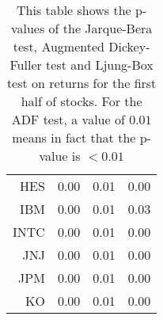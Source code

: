 \begin{table}[ht]
\begin{tabular}{rrrr}
  HES & 0.00 & 0.01 & 0.00 \\ 
  IBM & 0.00 & 0.01 & 0.03 \\ 
  INTC & 0.00 & 0.01 & 0.00 \\ 
  JNJ & 0.00 & 0.01 & 0.00 \\ 
  JPM & 0.00 & 0.01 & 0.00 \\ 
  KO & 0.00 & 0.01 & 0.00 \\ 
   \hline
\end{tabular}
\caption[JB test, ADF test, LB text on returns. (1)]{This table shows the p-values of the Jarque-Bera test, Augmented Dickey-Fuller test and Ljung-Box test 
                     on returns for the first half of stocks. For the ADF test, a value of $0.01$ means in fact that the p-value is $<0.01$} 
\label{Table:Rets_p_vals_1}
\end{table}
